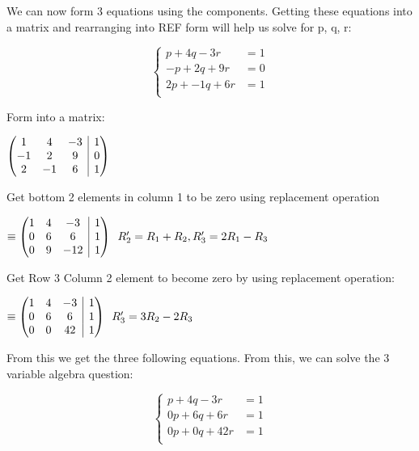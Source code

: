 \documentclass[12pt]{book}
\makeatletter
\newenvironment{amatrix}[1]{%
  \left(\begin{array}{@{}*{#1}{c}|c@{}}
}{%
  \end{array}\right)
}
\makeatother
\begin{document}
\begin{enumerate}
We can now form 3 equations using the components. Getting these equations into 
a matrix and rearranging into REF form will help us solve for p, q, r:

\[ \begin{cases} 
  p + 4q - 3r & = 1\\
  -p + 2q + 9r & = 0\\
  2p + -1q + 6r & = 1\\
\end{cases}
\]

\vspace{0.4cm}
Form into a matrix:
\vspace{0.4cm}

$
\begin{amatrix}{3}
   1 & 4 & -3 & 1\\  -1 & 2 & 9 & 0\\ 2 & -1 & 6  & 1
 \end{amatrix}
$

\vspace{0.4cm}
Get bottom 2 elements in column 1 to be zero using replacement operation
\vspace{0.4cm}

$
\equiv
\begin{amatrix}{3}
   1 & 4 & -3 & 1\\  0 & 6 & 6 & 1\\ 0 & 9 & -12  & 1
 \end{amatrix}
 \text{\space \space } R'_2 = R_1 + R_2, R'_3 = 2R_1 - R_3
$

\vspace{0.4cm}
Get Row 3 Column 2 element to become zero by using replacement operation:
\vspace{0.4cm}

$
\equiv
\begin{amatrix}{3}
   1 & 4 & -3 & 1\\  0 & 6 & 6 & 1\\ 0 & 0 & 42  & 1
 \end{amatrix}
 \text{\space \space } R'_3 = 3R_2 - 2R_3
$

From this we get the three following equations. From this, we can solve the 3 variable algebra question:

\[ \begin{cases} 
  p + 4q - 3r & = 1\\
  0p + 6q + 6r & = 1\\
  0p + 0q + 42r & = 1\\
\end{cases}
\]


\end{enumerate}
\end{document}
